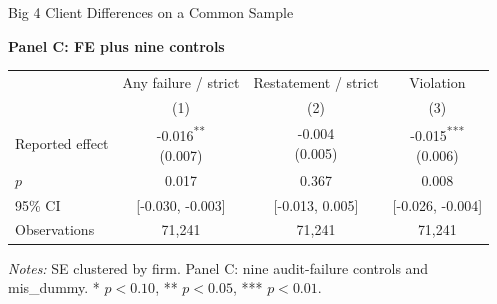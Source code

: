 \documentclass[10pt]{article}
\newcommand{\sym}[1]{\textsuperscript{#1}}
\begin{document}
\fontsize{10}{12}\selectfont
\setlength{\tabcolsep}{3pt}\renewcommand{\arraystretch}{1.15}
\begin{center}\large Big 4 Client Differences on a Common Sample\end{center}
\medskip\textbf{Panel C: FE plus nine controls}\par\smallskip
\begin{tabular*}{\textwidth}{@{\extracolsep{\fill}}lccc@{}}
\toprule
 & Any failure / strict & Restatement / strict & Violation \\
 & (1) & (2) & (3) \\
\midrule
Reported effect & \shortstack{-0.016\sym{**}\\(0.007)} & \shortstack{-0.004\\(0.005)} & \shortstack{-0.015\sym{***}\\(0.006)} \\
$p$ & 0.017 & 0.367 & 0.008 \\
95\% CI & [-0.030, -0.003] & [-0.013, 0.005] & [-0.026, -0.004] \\
Observations & 71,241 & 71,241 & 71,241 \\
\bottomrule\end{tabular*}\par
\medskip\fontsize{9}{11}\selectfont\textit{Notes:} SE clustered by firm. Panel C: nine audit-failure controls and mis\_dummy. * $p<0.10$, ** $p<0.05$, *** $p<0.01$.
\end{document}
